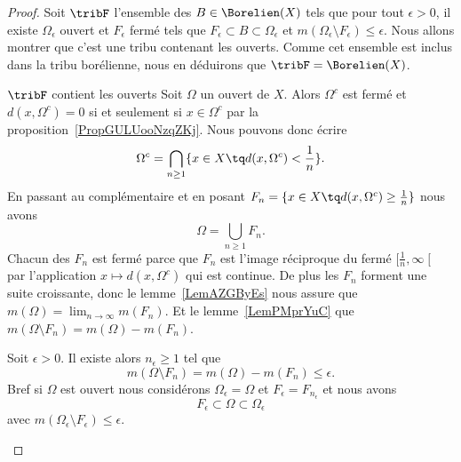 \begin{proof}
    Soit \( \tribF\) l'ensemble des \( B\in\Borelien(X)\) tels que pour tout \( \epsilon>0\), il existe \( \Omega_{\epsilon}\) ouvert et \( F_{\epsilon}\) fermé tels que \( F_{\epsilon}\subset B\subset \Omega_{\epsilon}\) et \( m(\Omega_{\epsilon}\setminus F_{\epsilon})\leq \epsilon\). Nous allons montrer que c'est une tribu contenant les ouverts. Comme cet ensemble est inclus dans la tribu borélienne, nous en déduirons que \( \tribF=\Borelien(X)\).
    \begin{subproof}
        \item[\( \tribF\) contient les ouverts]
            Soit \( \Omega\) un ouvert de \( X\). Alors \( \Omega^c\) est fermé et \( d(x,\Omega^c)=0\) si et seulement si \( x\in \Omega^c\) par la proposition~\ref{PropGULUooNzqZKj}. Nous pouvons donc écrire
            \begin{equation}
                 \Omega^c=\bigcap_{n\geq 1}\{ x\in X\tq d(x,\Omega^c)<\frac{1}{ n } \}.
            \end{equation}
            En passant au complémentaire et en posant \( F_n=\{ x\in X\tq d(x,\Omega^c)\geq \frac{1}{ n } \}\) nous avons
            \begin{equation}
                \Omega=\bigcup_{n\geq 1}F_n.
            \end{equation}
            Chacun des \( F_n\) est fermé parce que \( F_n\) est l'image réciproque du fermé \( \mathopen[ \frac{1}{ n } , \infty \mathclose[\) par l'application \( x\mapsto d(x,\Omega^c)\) qui est continue. De plus les \( F_n\) forment une suite croissante, donc le lemme~\ref{LemAZGByEs} nous assure que \( m(\Omega)=\lim_{n\to \infty}m(F_n)\). Et le lemme~\ref{LemPMprYuC} que \( m(\Omega\setminus F_n)=m(\Omega)-m(F_n)\).

            Soit \( \epsilon>0\). Il existe alors \( n_{\epsilon}\geq 1\) tel que
            \begin{equation}
                m(\Omega\setminus F_n)=m(\Omega)-m(F_n)\leq \epsilon.
            \end{equation}
            Bref si \( \Omega\) est ouvert nous considérons \( \Omega_{\epsilon}=\Omega\) et \( F_{\epsilon}=F_{n_{\epsilon}}\) et nous avons
            \begin{equation}
                F_{\epsilon}\subset \Omega\subset \Omega_{\epsilon}
            \end{equation}
            avec \( m(\Omega_{\epsilon}\setminus F_{\epsilon})\leq \epsilon\).


\end{subproof}
\end{proof}
